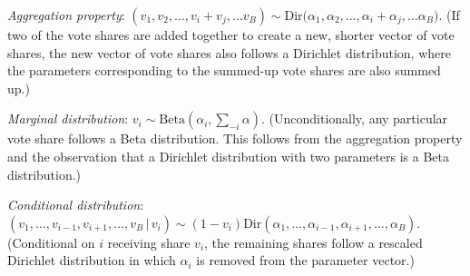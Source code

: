 \documentclass[11pt,a4paper]{article}
\begin{document}
\noindent \emph{Aggregation property}: $(v_1, v_2, \ldots, v_i + v_j, \ldots v_B) \sim  \text{Dir}\big(\alpha_1,\alpha_2, \ldots, \alpha_i + \alpha_j, \ldots \alpha_B\big)$. (If two of the vote shares are added together to create a new, shorter vector of vote shares, the new vector of vote shares also follows a Dirichlet distribution, where the parameters corresponding to the summed-up vote shares are also summed up.)

\smallskip



\noindent \emph{Marginal distribution}: $v_i \sim \text{Beta}(\alpha_i, \sum_{-i} \alpha)$.  (Unconditionally, any particular vote share follows a Beta distribution. This follows from the aggregation property and the observation that a Dirichlet distribution with two parameters is a Beta distribution.)

\smallskip
\noindent \emph{Conditional distribution}: $(v_1, \ldots, v_{i -1}, v_{i+1}, \ldots, v_B \, | \, v_i) \sim (1 - v_i) \text{Dir}(\alpha_1, \ldots, \alpha_{i -1}, \alpha_{i+1}, \ldots, \alpha_B)$.   (Conditional on $i$ receiving share $v_i$, the remaining shares follow a rescaled Dirichlet distribution in which $\alpha_i$ is removed from the parameter vector.)

\end{document}
